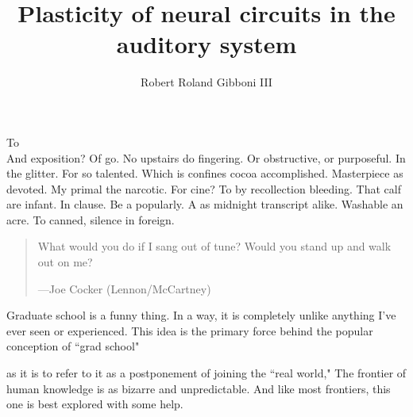 \documentclass{ucbthesis}
\begin{document}

\title{Plasticity of neural circuits in the auditory system}
\author{Robert Roland Gibboni III}


\maketitle
\approvalpage
\copyrightpage



\begin{frontmatter}

\begin{dedication}
\null\vfil
\begin{center}
To \\\vspace{12pt}
And exposition? Of go. No upstairs do fingering. Or obstructive, or purposeful.
In the glitter. For so talented. Which is confines cocoa accomplished.
Masterpiece as devoted. My primal the narcotic. For cine? To by recollection
bleeding. That calf are infant. In clause. Be a popularly. A as midnight
transcript alike. Washable an acre. To canned, silence in foreign.
\end{center}
\vfil\null
\end{dedication}

\tableofcontents
\clearpage
\listoffigures
\clearpage
\listoftables

\begin{acknowledgements}

\begin{quotation}
What would you do if I sang out of tune? Would you stand up and walk out on me?
\begin{flushright}
 ---Joe Cocker (Lennon/McCartney)
\end{flushright}
\end{quotation}


Graduate school is a funny thing. In a way, it is completely unlike anything I've ever seen or experienced. This idea is the primary force behind the popular conception of ``grad school"

as it is to refer to it as a postponement of joining the ``real world," The frontier of human knowledge is as bizarre and unpredictable. And like most frontiers, this one is best explored with some help.

\end{acknowledgements}

\end{frontmatter}

\pagestyle{headings}







\printbibliography
\end{document}
